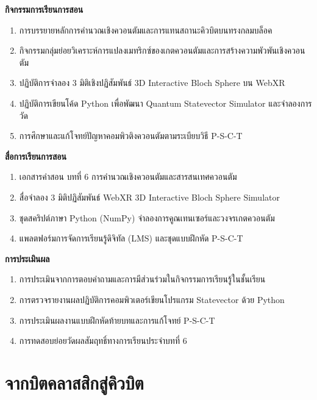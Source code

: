 \begin{lessonplanbox}
\noindent\textbf{กิจกรรมการเรียนการสอน}
\begin{enumerate}
    \item การบรรยายหลักการคำนวณเชิงควอนตัมและการแทนสถานะคิวบิตบนทรงกลมบล็อค
    \item กิจกรรมกลุ่มย่อยวิเคราะห์การแปลงเมทริกซ์ของเกตควอนตัมและการสร้างความพัวพันเชิงควอนตัม
    \item ปฏิบัติการจำลอง 3 มิติเชิงปฏิสัมพันธ์ 3D Interactive Bloch Sphere บน WebXR
    \item ปฏิบัติการเขียนโค้ด Python เพื่อพัฒนา Quantum Statevector Simulator และจำลองการวัด
    \item การศึกษาและแก้โจทย์ปัญหาคอมพิวติงควอนตัมตามระเบียบวิธี P-S-C-T
\end{enumerate}

\noindent\textbf{สื่อการเรียนการสอน}
\begin{enumerate}
    \item เอกสารคำสอน บทที่ 6 การคำนวณเชิงควอนตัมและสารสนเทศควอนตัม
    \item สื่อจำลอง 3 มิติปฏิสัมพันธ์ WebXR 3D Interactive Bloch Sphere Simulator
    \item ชุดสคริปต์ภาษา Python (NumPy) จำลองการคูณเทนเซอร์และวงจรเกตควอนตัม
    \item แพลตฟอร์มการจัดการเรียนรู้ดิจิทัล (LMS) และชุดแบบฝึกหัด P-S-C-T
\end{enumerate}

\noindent\textbf{การประเมินผล}
\begin{enumerate}
    \item การประเมินจากการตอบคำถามและการมีส่วนร่วมในกิจกรรมการเรียนรู้ในชั้นเรียน
    \item การตรวจรายงานผลปฏิบัติการคอมพิวเตอร์เขียนโปรแกรม Statevector ด้วย Python
    \item การประเมินผลงานแบบฝึกหัดท้ายบทและการแก้โจทย์ P-S-C-T
    \item การทดสอบย่อยวัดผลสัมฤทธิ์ทางการเรียนประจำบทที่ 6
\end{enumerate}
\end{lessonplanbox}
\newpage

\section{จากบิตคลาสสิกสู่คิวบิต}

